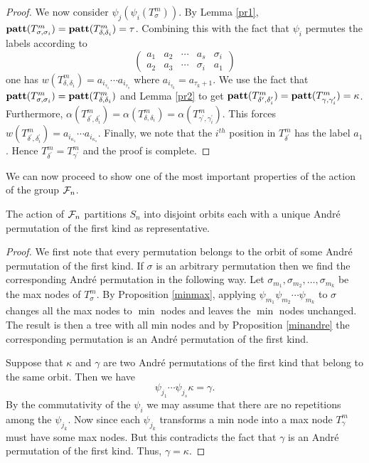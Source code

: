 \begin{proof}
We now consider $\psi_j(\psi_i(T^m_{\sigma}))$.
By Lemma \ref{pr1}, ${\bf patt}(T^m_{\sigma,\sigma_i}) = {\bf patt}(T^m_{\delta,\delta_i})=
\tau$. Combining this  with the fact that $\psi_i$ permutes the labels 
according to
$$\left(
\begin{array}{ccccc}
a_1 & a_2 & \cdots & a_s & \sigma_i \\
a_2 & a_3 & \cdots & \sigma_i & a_1
\end{array}\right)
$$
one has $w(T^m_{\delta,\delta_i}) = a_{i_{\tau_1}}\cdots a_{i_{\tau_s}}$
where $a_{i_{\tau_k}} = a_{\tau_k+1}$. We use the fact 
that ${\bf patt}(T^m_{\sigma,\sigma_i}) = {\bf patt}(T^m_{\delta,\delta_i})$
and  Lemma \ref{pr2} to get ${\bf patt}(T^m_{\delta^\prime,\delta^\prime_i})=
{\bf patt}(T^m_{\gamma,\gamma^\prime_i}) = \kappa$.
Furthermore, $\alpha(T^m_{\delta^\prime,\delta^\prime_i})
=\alpha(T^m_{\delta,\delta_i})=\alpha(T^m_{\gamma^\prime,\gamma^\prime_i})$.
This forces $w(T^m_{\delta^\prime,\delta_i^\prime}) =
a_{i_{\kappa_1}}\cdots a_{i_{\kappa_s}}$. Finally, we note that the
$i^{th}$ position in $T_{\delta^\prime}^m$ has the label $a_1$. Hence
$T^m_{\delta^\prime} =T^m_{\gamma^\prime}$ and the proof is complete.
\end{proof} 

We can now proceed to show one of the most important properties of the
action of the group ${\cal F}_n$. 
\begin{corollary}
The action of ${\cal F}_n$ partitions $S_n$ into disjoint orbits
each with a unique Andr\'e permutation of the first kind as representative.
\end{corollary}
\begin{proof} We first note that every permutation belongs to the orbit of
some Andr\'e permutation of the first kind. If $\sigma$ is an
arbitrary permutation then we find the corresponding Andr\'e permutation
in the following way. 
Let $\sigma_{m_1},\sigma_{m_2},\ldots,\sigma_{m_k}$ be the max nodes
of $T_\sigma^m$. By Proposition \ref{minmax}, applying
$\psi_{m_1} \psi_{m_2} \cdots \psi_{m_k} $ to $\sigma$ changes all the max
nodes to $\min$ nodes and leaves the $\min$ nodes unchanged.
The result is then a tree with all min nodes and by Proposition
\ref{minandre} the corresponding permutation is an Andr\'e permutation
of the first kind.

Suppose that $\kappa$ and $\gamma$ are two Andr\'e permutations  of the
first kind that belong to the same orbit. Then we have
$$
\psi_{j_1}\cdots \psi_{j_s}\kappa = \gamma.
$$ 
By the commutativity of the $\psi_i$ we may assume that there are no repetitions among the $\psi_{j_k}$.  Now since each $\psi_{j_k}$
transforms a min node into a max node $T_\gamma^m$ must have some
max nodes. But this contradicts the fact that $\gamma$ is an Andr\'e
permutation of the first kind.  Thus, $\gamma = \kappa$.\end{proof}



